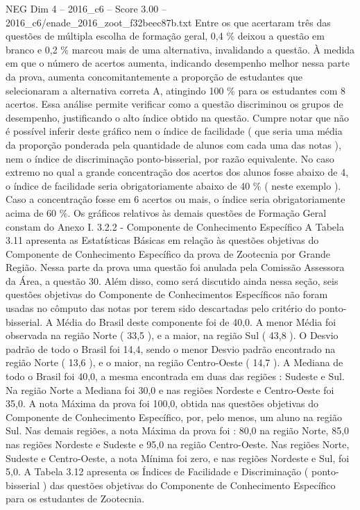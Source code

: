\begin{textsample}{NEG Dim 4 – 2016\_c6 – Score 3.00 – 2016\_c6/enade\_2016\_zoot\_f32beec87b.txt}
Entre os que acertaram três das questões de múltipla escolha de formação geral, 0,4 \% deixou a questão em branco e 0,2 \% marcou mais de uma alternativa, invalidando a questão.
À medida em que o número de acertos aumenta, indicando desempenho melhor nessa parte da prova, aumenta concomitantemente a proporção de estudantes que selecionaram a alternativa correta A, atingindo 100 \% para os estudantes com 8 acertos.
Essa análise permite verificar como a questão discriminou os grupos de desempenho, justificando o alto índice obtido na questão.
Cumpre notar que não é possível inferir deste gráfico nem o índice de facilidade ( que seria uma média da proporção ponderada pela quantidade de alunos com cada uma das notas ), nem o índice de discriminação ponto-bisserial, por razão equivalente.
No caso extremo no qual a grande concentração dos acertos dos alunos fosse abaixo de 4, o índice de facilidade seria obrigatoriamente abaixo de 40 \% ( neste exemplo ).
Caso a concentração fosse em 6 acertos ou mais, o índice seria obrigatoriamente acima de 60 \%.
Os gráficos relativos às demais questões de Formação Geral constam do Anexo I. 3.2.2 - Componente de Conhecimento Específico A Tabela 3.11 apresenta as Estatísticas Básicas em relação às questões objetivas do Componente de Conhecimento Específico da prova de Zootecnia por Grande Região.
Nessa parte da prova uma questão foi anulada pela Comissão Assessora da Área, a questão 30.
Além disso, como será discutido ainda nessa seção, seis questões objetivas do Componente de Conhecimentos Específicos não foram usadas no cômputo das notas por terem sido descartadas pelo critério do ponto-bisserial.
A Média do Brasil deste componente foi de 40,0.
A menor Média foi observada na região Norte ( 33,5 ), e a maior, na região Sul ( 43,8 ).
O Desvio padrão de todo o Brasil foi 14,4, sendo o menor Desvio padrão encontrado na região Norte ( 13,6 ), e o maior, na região Centro-Oeste ( 14,7 ).
A Mediana de todo o Brasil foi 40,0, a mesma encontrada em duas das regiões : Sudeste e Sul.
Na região Norte a Mediana foi 30,0 e nas regiões Nordeste e Centro-Oeste foi 35,0.
A nota Máxima da prova foi 100,0, obtida nas questões objetivas do Componente de Conhecimento Específico, por, pelo menos, um aluno na região Sul.
Nas demais regiões, a nota Máxima da prova foi : 80,0 na região Norte, 85,0 nas regiões Nordeste e Sudeste e 95,0 na região Centro-Oeste.
Nas regiões Norte, Sudeste e Centro-Oeste, a nota Mínima foi zero, e nas regiões Nordeste e Sul, foi 5,0.
A Tabela 3.12 apresenta os Índices de Facilidade e Discriminação ( ponto-bisserial ) das questões objetivas do Componente de Conhecimento Específico para os estudantes de Zootecnia.

\end{textsample}

